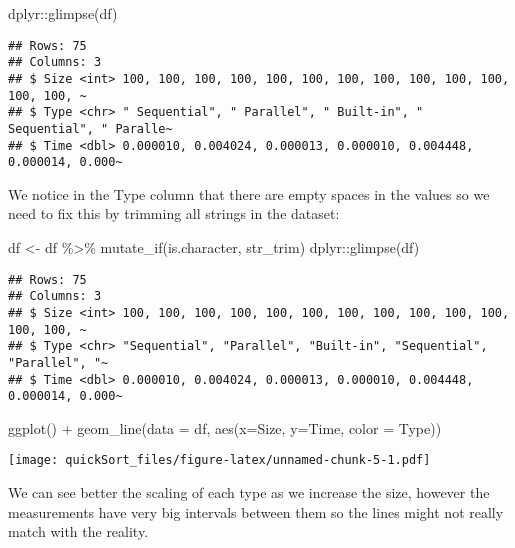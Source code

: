 \documentclass[
]{article}
\newenvironment{Shaded}{\begin{snugshade}}{\end{snugshade}}
\newcommand{\AttributeTok}[1]{\textcolor[rgb]{0.77,0.63,0.00}{#1}}
\newcommand{\FunctionTok}[1]{\textcolor[rgb]{0.00,0.00,0.00}{#1}}
\newcommand{\NormalTok}[1]{#1}
\newcommand{\OtherTok}[1]{\textcolor[rgb]{0.56,0.35,0.01}{#1}}
\newcommand{\SpecialCharTok}[1]{\textcolor[rgb]{0.00,0.00,0.00}{#1}}
\begin{document}
\begin{Shaded}
\begin{Highlighting}[]
\NormalTok{dplyr}\SpecialCharTok{::}\FunctionTok{glimpse}\NormalTok{(df)}
\end{Highlighting}
\end{Shaded}

\begin{verbatim}
## Rows: 75
## Columns: 3
## $ Size <int> 100, 100, 100, 100, 100, 100, 100, 100, 100, 100, 100, 100, 100, ~
## $ Type <chr> " Sequential", " Parallel", " Built-in", " Sequential", " Paralle~
## $ Time <dbl> 0.000010, 0.004024, 0.000013, 0.000010, 0.004448, 0.000014, 0.000~
\end{verbatim}

We notice in the Type column that there are empty spaces in the values
so we need to fix this by trimming all strings in the dataset:

\begin{Shaded}
\begin{Highlighting}[]
\NormalTok{df }\OtherTok{\textless{}{-}}\NormalTok{ df }\SpecialCharTok{\%\textgreater{}\%} \FunctionTok{mutate\_if}\NormalTok{(is.character, str\_trim)}
\NormalTok{dplyr}\SpecialCharTok{::}\FunctionTok{glimpse}\NormalTok{(df)}
\end{Highlighting}
\end{Shaded}

\begin{verbatim}
## Rows: 75
## Columns: 3
## $ Size <int> 100, 100, 100, 100, 100, 100, 100, 100, 100, 100, 100, 100, 100, ~
## $ Type <chr> "Sequential", "Parallel", "Built-in", "Sequential", "Parallel", "~
## $ Time <dbl> 0.000010, 0.004024, 0.000013, 0.000010, 0.004448, 0.000014, 0.000~
\end{verbatim}

\begin{Shaded}
\begin{Highlighting}[]
\FunctionTok{ggplot}\NormalTok{() }\SpecialCharTok{+}               
  \FunctionTok{geom\_line}\NormalTok{(}\AttributeTok{data =}\NormalTok{ df, }\FunctionTok{aes}\NormalTok{(}\AttributeTok{x=}\NormalTok{Size, }\AttributeTok{y=}\NormalTok{Time, }\AttributeTok{color =}\NormalTok{ Type))}
\end{Highlighting}
\end{Shaded}

\texttt{[image: quickSort\_files/figure-latex/unnamed-chunk-5-1.pdf]}

We can see better the scaling of each type as we increase the size,
however the measurements have very big intervals between them so the
lines might not really match with the reality.
\end{document}
